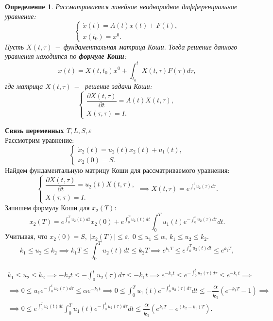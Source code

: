 \documentclass{article}
\begin{document}
\newtheorem{определение}{Определение}
\begin{определение}
    Рассматривается линейное неоднородное дифференциальное уравнение:
    $$
    \begin{cases}
        \dot{x}(t) = A(t)x(t) +F(t),\\
        x(t_0) = x^0.
    \end{cases}
    $$
    Пусть $X(t, \tau)~-~$фундаментальная матрица Коши. Тогда решение данного уравнения находится по \textbf{формуле Коши}:
    $$x(t) = X(t, t_0)x^0+\int^t_{t_0}X(t, \tau)F(\tau)d\tau,$$
    где матрица $X(t, \tau)~-~$ решение задачи Коши:
    $$
    \begin{cases}
        \dfrac{\partial X(t, \tau)}{\partial t} = A(t)X(t, \tau),\\
        X(\tau, \tau) = I.
    \end{cases}
    $$
\end{определение}
\textbf{Связь переменных $T, L, S, \varepsilon$}\\
Рассмотрим уравнение:
$$
\begin{cases}
    \dot{x}_2(t) = u_2(t)x_2(t)+u_1(t),\\
    x_2(0) = S.
\end{cases}
$$
Найдем фундаментальную матрицу Коши для рассматриваемого уравнения:
$$
\begin{cases}
    \dfrac{\partial X(t, \tau)}{\partial t} = u_2(t)X(t, \tau),\\
    X(\tau, \tau) = I.
\end{cases}
\implies X(t, \tau) = e^{\int^t_{\tau}u_2(\tau)d\tau}.
$$
Запишем формулу Коши для $x_2(T):$
$$x_2(T) = e^{\int_0^T u_2(t) dt} x_2(0) + e^{\int_0^T u_2(t) dt} \int_0^T u_1(t) e^{-\int_0^t u_2(\tau) d\tau} dt.$$
Учитывая, что $x_2(0)= S,~|x_2(T)|\leqslant\varepsilon, ~0\leqslant u_1\leqslant\alpha, ~k_1\leqslant u_2\leqslant k_2.$
$$k_1\leqslant u_2\leqslant k_2\implies k_1T\leqslant {\int_0^T u_2(t) dt}\leqslant k_2T \implies e^{k_1T}\leqslant 
e^{\int_0^T u_2(t) dt}\leqslant e^{k_2T},$$

\begin{multline*}
k_1 \leqslant u_2 \leqslant k_2 \implies -k_2 t \leqslant -\int_0^t u_2(\tau) d\tau \leqslant -k_1 t 
\implies e^{-k_2 t} \leqslant e^{-\int_0^t u_2(\tau) d\tau} \leqslant e^{-k_1 t} \implies\\
\implies 0 \leqslant u_1 e^{-\int_0^t u_2(\tau) d\tau} \leqslant \alpha e^{-k_1 t}
\implies 0 \leqslant \int_0^T u_1(t) e^{-\int_0^t u_2(\tau) d\tau} dt \leqslant -\dfrac{\alpha}{k_1} \left( e^{-k_1 T} - 1 \right) \implies\\
\implies 0 \leqslant e^{\int_0^T u_2(t) dt} \int_0^T u_1(t) e^{-\int_0^t u_2(\tau) d\tau} dt \leqslant \dfrac{\alpha}{k_1} \left( e^{k_2 T} - e^{(k_2 - k_1) T} \right).
\end{multline*}
\end{document}
